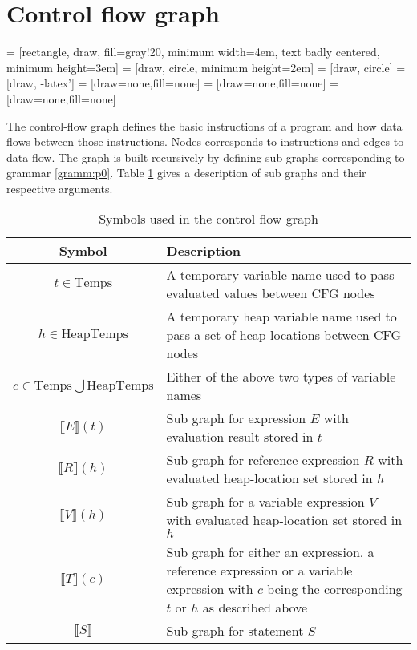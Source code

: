 \section{Control flow graph}
\label{sec:cfg}
 = [rectangle, draw, fill=gray!20,  minimum width=4em, text badly centered, minimum height=3em]
 = [draw, circle, minimum height=2em]
 = [draw, circle]
 = [draw, -latex']
 = [draw=none,fill=none]
 = [draw=none,fill=none]
 = [draw=none,fill=none]
\newcommand{\subt}[1]{\llbracket #1\rrbracket}

The control-flow graph defines the basic instructions of a program and how data flows between those instructions. Nodes corresponds to instructions and edges to data flow. The graph is built recursively by defining sub graphs corresponding to grammar \ref{gramm:p0}. Table \ref{tab:nodes} gives a description of sub graphs and their respective arguments.

\bgroup
\def\arraystretch{1.5}
\begin{table}[htbp]
\centering
\begin{tabularx}{\textwidth}{c|X}
 Symbol & Description \\\hline\hline
 $t \in \text{Temps}$ & A temporary variable name used to pass evaluated values between CFG nodes \\
 $h \in \text{HeapTemps}$ & A temporary heap variable name used to pass a set of heap locations between CFG nodes \\
 $c \in \text{Temps}\bigcup\text{HeapTemps}$ & Either of the above two types of variable names \\
 $\subt{E}(t)$ & Sub graph for expression $E$ with evaluation result stored in $t$ \\
 $\subt{R}(h)$ & Sub graph for reference expression $R$ with evaluated heap-location set stored in $h$ \\
 $\subt{V}(h)$ & Sub graph for a variable expression $V$ with evaluated heap-location set stored in $h$ \\
 $\subt{T}(c)$ & Sub graph for either an expression, a reference expression or a variable expression with $c$ being the corresponding $t$ or $h$ as described above \\
 $\subt{S}$ & Sub graph for statement $S$ 
\end{tabularx}
\caption{Symbols used in the control flow graph}
\label{tab:nodes}
\end{table}
\egroup

